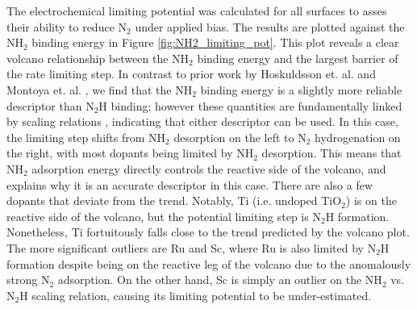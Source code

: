The electrochemical limiting potential was calculated for all surfaces to asses their ability to reduce N$_2$ under applied bias. The results are plotted against the NH$_2$ binding energy in Figure \ref{fig:NH2_limiting_pot}. This plot reveals a clear volcano relationship between the NH$_2$ binding energy and the largest barrier of the rate limiting step. In contrast to prior work by Hoskuldsson et. al.\cite{Hoskuldsson_2017} and Montoya et. al. \cite{Montoya_2015}, we find that the NH$_2$ binding energy is a slightly more reliable descriptor than N$_2$H binding; however these quantities are fundamentally linked by scaling relations 
, indicating that either descriptor can be used. In this case, the limiting step shifts from NH$_2$ desorption on the left to N$_2$ hydrogenation on the right, with most dopants being limited by NH$_2$ desorption. This means that NH$_2$ adsorption energy directly controls the reactive side of the volcano, and explains why it is an accurate descriptor in this case. There are also a few dopants that deviate from the trend. Notably, Ti (i.e. undoped TiO$_2$) is on the reactive side of the volcano, but the potential limiting step is N$_2$H formation\cite{Comer_2018, Hoskuldsson_2017}. Nonetheless, Ti fortuitously falls close to the trend predicted by the volcano plot. The more significant outliers are Ru and Sc, where Ru is also limited by N$_2$H formation despite being on the reactive leg of the volcano due to the anomalously strong N$_2$ adsorption. On the other hand, Sc is simply an outlier on the NH$_2$ vs. N$_2$H scaling relation, causing its limiting potential to be under-estimated.


